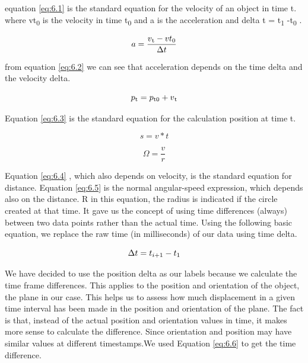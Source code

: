 equation \ref{eq:6.1} is the standard equation for the velocity of an object in time t.  where vt\textsubscript{0} is the velocity in time t\textsubscript{0} and a is the acceleration and delta t = t\textsubscript{1} -t\textsubscript{0} .

\begin{equation}
  a = \frac{v\textsubscript{t} - vt\textsubscript{0}} {\Delta t}  \label{eq:6.2}
\end{equation}

from equation  \ref{eq:6.2} we can see that acceleration depends on the time delta and the velocity delta.


\begin{equation}
p\textsubscript{t} = p\textsubscript{t0}  + v\textsubscript{t}  \label{eq:6.3}
\end{equation}

Equation  \ref{eq:6.3} is the standard equation for the calculation position at time t. 


\begin{equation}
s = v * t  \label{eq:6.4}
\end{equation}

\begin{equation}
\Omega = \frac {v} {r}  \label{eq:6.5}
\end{equation}

Equation  \ref{eq:6.4} , which also depends on velocity, is the standard equation for distance. Equation  \ref{eq:6.5}  is the normal angular-speed expression, which depends also on the distance. R in this equation, the radius is indicated if the circle created at that time. It gave us the concept of using time differences (always) between two data points rather than the actual time. Using the following basic equation, we replace the raw time (in milliseconds) of our data using time delta.

\begin{equation}
  \Delta t = t_{i+1} - t\textsubscript{1}  \label{eq:6.6}
\end{equation}

We have decided to use the position delta as our labels because we calculate the time frame differences. This applies to the position and orientation of the object, the plane in our case. This helps us to assess how much displacement in a given time interval has been made in the position and orientation of the plane. The fact is that, instead of the actual position and orientation values in time, it makes more sense to calculate the difference. Since orientation and position may have similar values at different timestamps.We used Equation  \ref{eq:6.6} to get the time difference.

